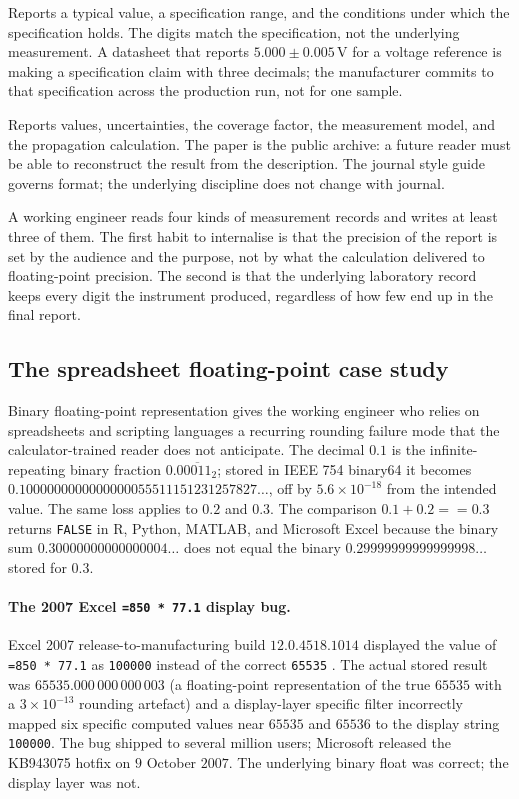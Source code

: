  Reports a typical value, a
specification range, and the conditions under which the
specification holds. The digits match the specification, not the
underlying measurement. A datasheet that reports
$5.000 \pm 0.005\,\si{\volt}$ for a voltage reference is making a
specification claim with three decimals; the manufacturer commits
to that specification across the production run, not for one
sample.

 Reports values, uncertainties,
the coverage factor, the measurement model, and the propagation
calculation. The paper is the public archive: a future reader must
be able to reconstruct the result from the description. The journal
style guide governs format; the underlying discipline does not
change with journal.

A working engineer reads four kinds of measurement records and
writes at least three of them. The first habit to internalise is
that the precision of the report is set by the audience and the
purpose, not by what the calculation delivered to floating-point
precision. The second is that the underlying laboratory record
keeps every digit the instrument produced, regardless of how few
end up in the final report.

\subsection{The spreadsheet floating-point case study}

Binary floating-point representation gives the working engineer
who relies on spreadsheets and scripting languages a recurring
rounding failure mode that the calculator-trained reader does
not anticipate. The decimal $0.1$ is the infinite-repeating
binary fraction $0.0\overline{0011}_{2}$; stored in IEEE 754
binary64 it becomes $0.1000000000000000055511151231257827\ldots$,
off by $5.6 \times 10^{-18}$ from the intended value. The same
loss applies to $0.2$ and $0.3$. The comparison
$0.1 + 0.2 == 0.3$ returns \texttt{FALSE} in R, Python, MATLAB,
and Microsoft Excel because the binary sum
$0.30000000000000004\ldots$ does not equal the binary
$0.29999999999999998\ldots$ stored for $0.3$.

\paragraph{The 2007 Excel \texttt{=850\,*\,77.1} display bug.}
Excel 2007 release-to-manufacturing build $12.0.4518.1014$
displayed the value of \texttt{=850\,*\,77.1} as \texttt{100000}
instead of the correct \texttt{65535} \cite{web:ch04t3-msft-excel2007-mul-bug}.
The actual stored result was $65535.000\,000\,000\,003$ (a
floating-point representation of the true $65535$ with a
$3 \times 10^{-13}$ rounding artefact) and a display-layer
specific filter incorrectly mapped six specific computed values
near $65535$ and $65536$ to the display string \texttt{100000}.
The bug shipped to several million users; Microsoft released
the KB943075 hotfix on $9$ October $2007$. The underlying
binary float was correct; the display layer was not.

